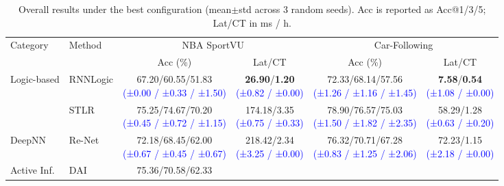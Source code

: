 \documentclass{article} %
\newcommand{\revise}[1]{\textcolor{blue}{#1}}
\begin{document}
\vspace{-5pt}
\begin{table}[H]
\centering
\footnotesize
\setlength{\tabcolsep}{1.5pt}
\renewcommand{\arraystretch}{1.08}
\caption{Overall results under the best configuration (mean$\pm$std across 3 random seeds). 
Acc is reported as Acc@1/3/5; Lat/CT in ms / h.}
\label{tab:overall_compact_all}
\begin{tabular}{l l c c c c}
\toprule
\multirow{2}{*}{Category} & \multirow{2}{*}{Method}
& \multicolumn{2}{c}{NBA SportVU} & \multicolumn{2}{c}{Car-Following} \\
\cmidrule(lr){3-4} \cmidrule(lr){5-6}
& & Acc (\%) & Lat/CT & Acc (\%) & Lat/CT \\
\midrule
\multirow{2}{*}{Logic-based}
& RNNLogic & \makecell[c]{67.20/60.55/51.83\\[-1pt]
\revise{{\footnotesize (±0.00 / ±0.33 / ±1.50)}}} & \makecell[c]{\textbf{26.90}/\textbf{1.20}\\[-1pt]
\revise{{\footnotesize (±0.82 / ±0.00)}}} & \makecell[c]{72.33/68.14/57.56\\[-1pt]
\revise{{\footnotesize (±1.26 / ±1.16 / ±1.45)}}} & \makecell[c]{\textbf{7.58}/\textbf{0.54}\\[-1pt]
\revise{{\footnotesize (±1.08 / ±0.00)}}} \\
& STLR     & \makecell[c]{75.25/74.67/70.20\\[-1pt]
\revise{{\footnotesize (±0.45 / ±0.72 / ±1.15)}}} & \makecell[c]{174.18/3.35\\[-1pt]
\revise{{\footnotesize (±0.75 / ±0.33)}}} & \makecell[c]{78.90/76.57/75.03\\[-1pt]
\revise{{\footnotesize (±1.50 / ±1.82 / ±2.35)}}} & \makecell[c]{58.29/1.28\\[-1pt]
\revise{{\footnotesize (±0.63 / ±0.20)}}} \\
DeepNN & Re-Net & \makecell[c]{72.18/68.45/62.00\\[-1pt]
\revise{{\footnotesize (±0.67 / ±0.45 / ±0.67)}}} & \makecell[c]{218.42/2.34\\[-1pt]
\revise{{\footnotesize (±3.25 / ±0.00)}}} & \makecell[c]{76.32/70.71/67.28\\[-1pt]
\revise{{\footnotesize (±0.83 / ±1.25 / ±2.06)}}} & \makecell[c]{72.23/1.15\\[-1pt]
\revise{{\footnotesize (±2.18 / ±0.00)}}} \\
\multirow{2}{*}{Active Inf.}
& DAI      & \makecell[c]{75.36/70.58/62.33\\[-1pt]
}
\end{tabular}
\end{table}
\end{document}

